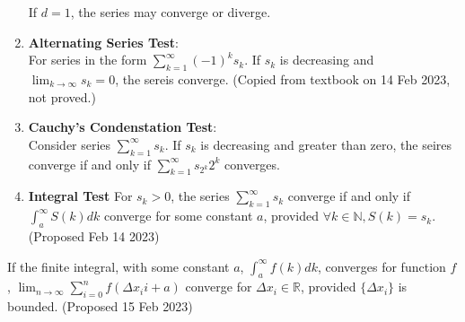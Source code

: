 \documentclass[../note.tex]{subfiles}
\begin{document}
\begin{theorem}
\begin{enumerate}
		If $d=1$, the series may converge or diverge.
	\item \textbf{Alternating Series Test}: \label{AlternatingSeriesTest}\\
		For series in the form $\sum^{\infty}_{k=1}(-1)^{k}s_k$. If $s_k$ is decreasing and $\lim_{k\to \infty} s_k = 0$, the sereis converge. (Copied from textbook on 14 Feb 2023, not proved.)
	\item \label{Cauchy_Condensation_Test} \textbf{Cauchy's Condenstation Test}:\\
		Consider series $\sum^{\infty}_{k=1}s_k$. If ${s_k}$ is decreasing and greater than zero, the seires converge if and only if $\sum^{\infty}_{k=1}s_{2^k}2^k $ converges. 
	\item \textbf{Integral Test}\label{IntegralTest}
		For $s_k>0$, the series $\sum^{\infty}_{k=1}s_k$ converge if and only if $\int_{a}^{\infty}S(k)dk$ converge for some constant $a$, provided $\forall k \in \mathbb{N}, S(k)=s_k$.
		(Proposed Feb 14 2023)

\end{enumerate}
\end{theorem}

\begin{hypothesis}\label{hypothesis:Finite Riamenn Sum}
	If the finite integral, with some constant $a$, $\int_{a}^{\infty}f(k)dk$, converges for function $f$, $\lim_{n \to \infty}\sum^{n}_{i=0} f(\Delta x_ii + a)$ converge for $\Delta x_i \in \mathbb{R}$, provided $\{\Delta x_i\}$ is bounded. (Proposed 15 Feb 2023)
\end{hypothesis}
\end{document}
